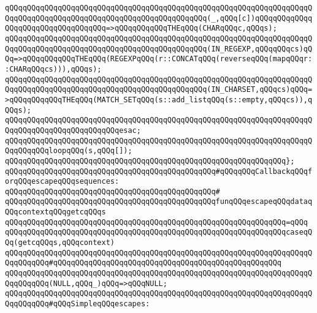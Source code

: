\verb|qQQqqQQqqQQqqQQqqQQqqQQqqQQqqQQqqQQqqQQqqQQqqQQqqQQqqQQqqQQqqQQqqQQqqQQqqQQqqQQqqQQqqQQqqQQqqQQqqQQqqQQqqQQqqQQqqQQq(_,qQQq[c])qQQqqQQqqQQqqQQqqQQqqQQqqQQqqQQqqQQq=>qQQqqQQqqQQqTHEqQQq(CHARqQQqc,qQQqs);|\newline
\verb|qQQqqQQqqQQqqQQqqQQqqQQqqQQqqQQqqQQqqQQqqQQqqQQqqQQqqQQqqQQqqQQqqQQqqQQqqQQqqQQqqQQqqQQqqQQqqQQqqQQqqQQqqQQqqQQqqQQq(IN_REGEXP,qQQqqQQqcs)qQQq=>qQQqqQQqqQQqTHEqQQq(REGEXPqQQq(r::CONCATqQQq(reverseqQQq(mapqQQqr::CHARqQQqcs))),qQQqs);|\newline
\verb|qQQqqQQqqQQqqQQqqQQqqQQqqQQqqQQqqQQqqQQqqQQqqQQqqQQqqQQqqQQqqQQqqQQqqQQqqQQqqQQqqQQqqQQqqQQqqQQqqQQqqQQqqQQqqQQqqQQq(IN_CHARSET,qQQqcs)qQQq=>qQQqqQQqqQQqTHEqQQq(MATCH_SETqQQq(s::add_listqQQq(s::empty,qQQqcs)),qQQqs);|\newline
\verb|qQQqqQQqqQQqqQQqqQQqqQQqqQQqqQQqqQQqqQQqqQQqqQQqqQQqqQQqqQQqqQQqqQQqqQQqqQQqqQQqqQQqqQQqqQQqqQQqesac;|\newline
\newline
\verb|qQQqqQQqqQQqqQQqqQQqqQQqqQQqqQQqqQQqqQQqqQQqqQQqqQQqqQQqqQQqqQQqqQQqqQQqqQQqqQQqloopqQQq(s,qQQq[]);|\newline
\verb|qQQqqQQqqQQqqQQqqQQqqQQqqQQqqQQqqQQqqQQqqQQqqQQqqQQqqQQqqQQqqQQq};|\newline
\newline
\newline
\newline
\verb|qQQqqQQqqQQqqQQqqQQqqQQqqQQqqQQqqQQqqQQqqQQqqQQq#qQQqqQQqCallbackqQQqforqQQqescapeqQQqsequences:|\newline
\verb|qQQqqQQqqQQqqQQqqQQqqQQqqQQqqQQqqQQqqQQqqQQqqQQq#|\newline
\verb|qQQqqQQqqQQqqQQqqQQqqQQqqQQqqQQqqQQqqQQqqQQqqQQqfunqQQqescapeqQQqdataqQQqcontextqQQqgetcqQQqs|\newline
\verb|qQQqqQQqqQQqqQQqqQQqqQQqqQQqqQQqqQQqqQQqqQQqqQQqqQQqqQQqqQQqqQQq=qQQq|\newline
\verb|qQQqqQQqqQQqqQQqqQQqqQQqqQQqqQQqqQQqqQQqqQQqqQQqqQQqqQQqqQQqqQQqcaseqQQq(getcqQQqs,qQQqcontext)|\newline
\verb|qQQqqQQqqQQqqQQqqQQqqQQqqQQqqQQqqQQqqQQqqQQqqQQqqQQqqQQqqQQqqQQqqQQqqQQqqQQqqQQq#qQQqqQQqqQQqqQQqqQQqqQQqqQQqqQQqqQQqqQQqqQQqqQQqqQQq|\newline
\verb|qQQqqQQqqQQqqQQqqQQqqQQqqQQqqQQqqQQqqQQqqQQqqQQqqQQqqQQqqQQqqQQqqQQqqQQqqQQqqQQq(NULL,qQQq_)qQQq=>qQQqNULL;|\newline
\newline
\verb|qQQqqQQqqQQqqQQqqQQqqQQqqQQqqQQqqQQqqQQqqQQqqQQqqQQqqQQqqQQqqQQqqQQqqQQqqQQqqQQq#qQQqSimpleqQQqescapes:|\newline
